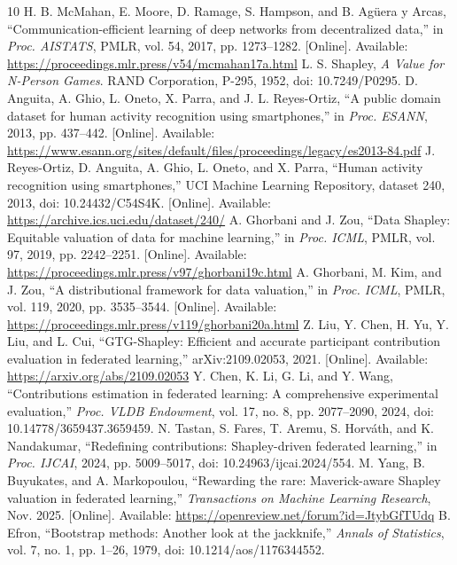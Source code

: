 \documentclass[conference,letterpaper]{IEEEtran}
\begin{document}
\begin{thebibliography}{10}
 H. B. McMahan, E. Moore, D. Ramage, S. Hampson, and B. Ag\"uera y Arcas, ``Communication-efficient learning of deep networks from decentralized data,'' in \emph{Proc. AISTATS}, PMLR, vol. 54, 2017, pp. 1273--1282. [Online]. Available: \url{https://proceedings.mlr.press/v54/mcmahan17a.html}
 L. S. Shapley, \emph{A Value for N-Person Games}. RAND Corporation, P-295, 1952, doi: 10.7249/P0295.
 D. Anguita, A. Ghio, L. Oneto, X. Parra, and J. L. Reyes-Ortiz, ``A public domain dataset for human activity recognition using smartphones,'' in \emph{Proc. ESANN}, 2013, pp. 437--442. [Online]. Available: \url{https://www.esann.org/sites/default/files/proceedings/legacy/es2013-84.pdf}
 J. Reyes-Ortiz, D. Anguita, A. Ghio, L. Oneto, and X. Parra, ``Human activity recognition using smartphones,'' UCI Machine Learning Repository, dataset 240, 2013, doi: 10.24432/C54S4K. [Online]. Available: \url{https://archive.ics.uci.edu/dataset/240/}
 A. Ghorbani and J. Zou, ``Data Shapley: Equitable valuation of data for machine learning,'' in \emph{Proc. ICML}, PMLR, vol. 97, 2019, pp. 2242--2251. [Online]. Available: \url{https://proceedings.mlr.press/v97/ghorbani19c.html}
 A. Ghorbani, M. Kim, and J. Zou, ``A distributional framework for data valuation,'' in \emph{Proc. ICML}, PMLR, vol. 119, 2020, pp. 3535--3544. [Online]. Available: \url{https://proceedings.mlr.press/v119/ghorbani20a.html}
 Z. Liu, Y. Chen, H. Yu, Y. Liu, and L. Cui, ``GTG-Shapley: Efficient and accurate participant contribution evaluation in federated learning,'' arXiv:2109.02053, 2021. [Online]. Available: \url{https://arxiv.org/abs/2109.02053}
 Y. Chen, K. Li, G. Li, and Y. Wang, ``Contributions estimation in federated learning: A comprehensive experimental evaluation,'' \emph{Proc. VLDB Endowment}, vol. 17, no. 8, pp. 2077--2090, 2024, doi: 10.14778/3659437.3659459.
 N. Tastan, S. Fares, T. Aremu, S. Horv\'ath, and K. Nandakumar, ``Redefining contributions: Shapley-driven federated learning,'' in \emph{Proc. IJCAI}, 2024, pp. 5009--5017, doi: 10.24963/ijcai.2024/554.
 M. Yang, B. Buyukates, and A. Markopoulou, ``Rewarding the rare: Maverick-aware Shapley valuation in federated learning,'' \emph{Transactions on Machine Learning Research}, Nov. 2025. [Online]. Available: \url{https://openreview.net/forum?id=JtybGfTUdq}
 B. Efron, ``Bootstrap methods: Another look at the jackknife,'' \emph{Annals of Statistics}, vol. 7, no. 1, pp. 1--26, 1979, doi: 10.1214/aos/1176344552.
\end{thebibliography}
\end{document}
